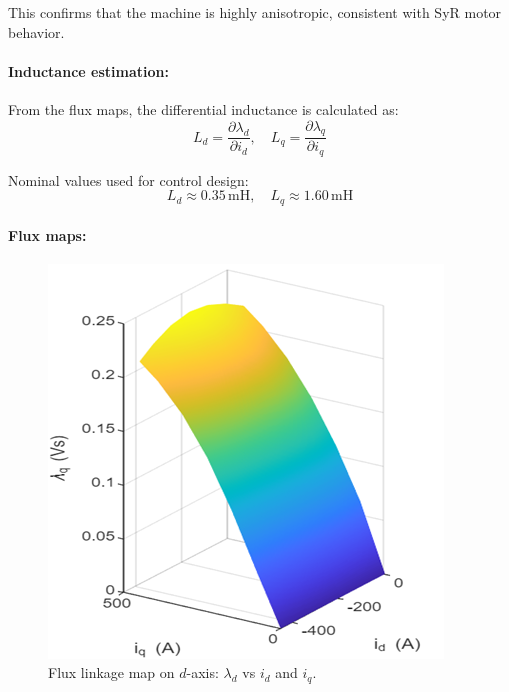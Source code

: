This confirms that the machine is highly anisotropic, consistent with SyR motor behavior.

\paragraph{Inductance estimation:}

From the flux maps, the differential inductance is calculated as:
\begin{equation}
L_d = \frac{\partial \lambda_d}{\partial i_d}, \quad
L_q = \frac{\partial \lambda_q}{\partial i_q}
\end{equation}

Nominal values used for control design:
\begin{equation}
L_d \approx 0.35 \, \text{mH}, \quad L_q \approx 1.60 \, \text{mH}
\end{equation}

\paragraph{Flux maps:}

\begin{figure}[!ht]
    \centering
    \includegraphics[width=0.8\linewidth]{Figures/Flux map on d axis.png}
    \caption{Flux linkage map on $d$-axis: $\lambda_d$ vs $i_d$ and $i_q$.}
    \label{fig:flux_d}
\end{figure}

